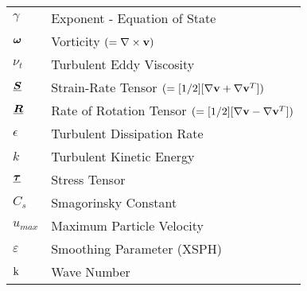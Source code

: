 \begin{longtable}{ll}
$\gamma$                & Exponent - Equation of State      \\
$\bm{\omega}$                   & Vorticity $(=\nabla \times \mathbf{v})$                                                       \\
$\nu_t$                 & Turbulent Eddy Viscosity          \\
$\underline{\bm{S}}$                   & Strain-Rate Tensor $(=[1/2][\nabla \mathbf{v} + \nabla \mathbf{v}^T])$                          \\
$\underline{\bm{R}}$                   & Rate of Rotation Tensor $(=[1/2][\nabla \mathbf{v} - \nabla \mathbf{v}^T])$                     \\
$\epsilon$              & Turbulent Dissipation Rate        \\
$k$                     & Turbulent Kinetic Energy          \\
$\underline{\bm{\tau}}$         & Stress Tensor                     \\
$C_s $                  & Smagorinsky Constant              \\
$u_{max}$               & Maximum Particle Velocity         \\
$\varepsilon$           & Smoothing Parameter (XSPH)        \\
$\mathrm{k}$           & Wave Number                      
\end{longtable}